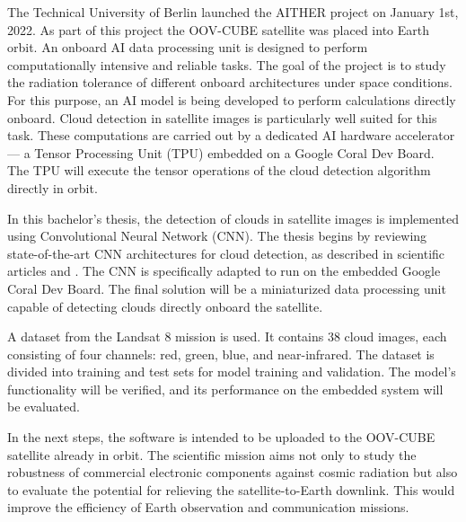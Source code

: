{

The Technical University of Berlin launched the AITHER project on January 1st, 2022. As part of this project the OOV-CUBE satellite was placed into Earth orbit. An onboard AI data processing unit is designed to perform computationally intensive and reliable tasks. The goal of the project is to study the radiation tolerance of different onboard architectures under space conditions. For this purpose, an AI model is being developed to perform calculations directly onboard. Cloud detection in satellite images is particularly well suited for this task. These computations are carried out by a dedicated AI hardware accelerator --- a Tensor Processing Unit (TPU) embedded on a Google Coral Dev Board. The TPU will execute the tensor operations of the cloud detection algorithm directly in orbit.

In this bachelor's thesis, the detection of clouds in satellite images is implemented using Convolutional Neural Network (CNN). The thesis begins by reviewing state-of-the-art CNN architectures for cloud detection, as described in scientific articles \cite{CloudNet2019} and \cite{CloudDet2018}. The CNN is specifically adapted to run on the embedded Google Coral Dev Board. The final solution will be a miniaturized data processing unit capable of detecting clouds directly onboard the satellite.

A dataset from the Landsat 8 mission is used. It contains 38 cloud images, each consisting of four channels: red, green, blue, and near-infrared. The dataset is divided into training and test sets for model training and validation. The model's functionality will be verified, and its performance on the embedded system will be evaluated.

In the next steps, the software is intended to be uploaded to the OOV-CUBE satellite already in orbit. The scientific mission aims not only to study the robustness of commercial electronic components against cosmic radiation but also to evaluate the potential for relieving the satellite-to-Earth downlink. This would improve the efficiency of Earth observation and communication missions.

}